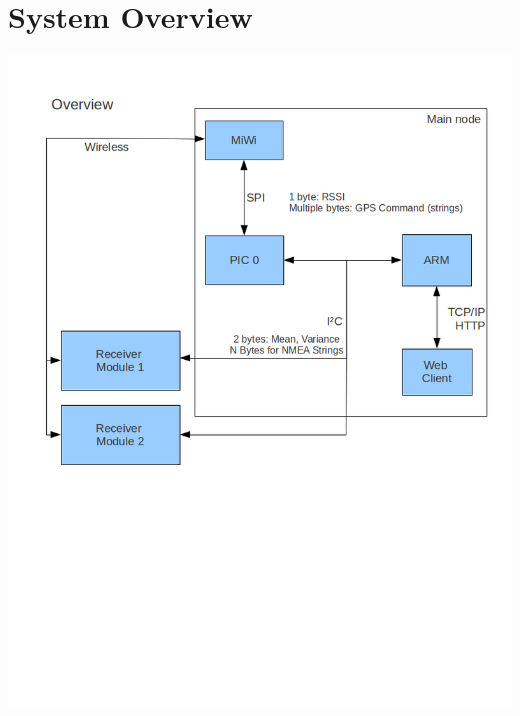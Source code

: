 \documentclass{article}
\begin{document}
\section*{System Overview}
\includegraphics[width=1.1\textwidth]{blockdiagram_overview}
\end{document}
